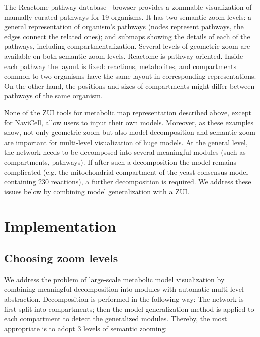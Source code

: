 \documentclass{bmcart}
\begin{document}
The Reactome pathway database~\cite{Milacic2012, Croft2013} browser provides a zommable visualization of manually curated pathways for 19 organisms. It has two semantic zoom levels: a general representation of organism's pathways (nodes represent pathways, the edges connect the related ones); and submaps showing the details of each of the pathways, including compartmentalization. Several levels of geometric zoom are available on both semantic zoom levels. Reactome is pathway-oriented. Inside each pathway the layout is fixed: reactions, metabolites, and compartments common to two organisms have the same layout in corresponding representations. On the other hand, the positions and sizes of compartments might differ between pathways of the same organism.

None of the ZUI tools for metabolic map representation described above, except for NaviCell, allow users to input their own models. Moreover, as these examples show, not only geometric zoom but also model decomposition and semantic zoom are important for multi-level visualization of huge models. At the general level, the network needs to be decomposed into several meaningful modules (such as compartments, pathways). If after such a decomposition the model remains complicated (e.g. the mitochondrial compartment of the yeast consensus model~\cite{Herrgard2008} containing 230 reactions), a further decomposition is required. We address these issues below by combining model generalization with a ZUI.


\section*{Implementation}

\subsection*{Choosing zoom levels}
We address the problem of large-scale metabolic model visualization by combining meaningful decomposition into modules with automatic multi-level abstraction. Decomposition is performed in the following way: The network is first split into compartments; then the model generalization method is applied to each compartment to detect the generalized modules. Thereby, the most appropriate is to adopt 3 levels of semantic zooming:
\end{document}

